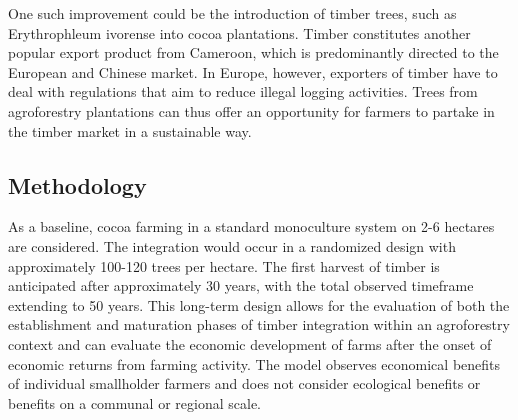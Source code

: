 \documentclass[
]{article}
\begin{document}
One such improvement could be the introduction of timber trees, such as
Erythrophleum ivorense into cocoa plantations. Timber constitutes
another popular export product from Cameroon, which is predominantly
directed to the European and Chinese market. In Europe, however,
exporters of timber have to deal with regulations that aim to reduce
illegal logging activities. Trees from agroforestry plantations can thus
offer an opportunity for farmers to partake in the timber market in a
sustainable way.

\hypertarget{methodology}{%
\subsection{Methodology}\label{methodology}}

As a baseline, cocoa farming in a standard monoculture system on 2-6
hectares are considered. The integration would occur in a randomized
design with approximately 100-120 trees per hectare. The first harvest
of timber is anticipated after approximately 30 years, with the total
observed timeframe extending to 50 years. This long-term design allows
for the evaluation of both the establishment and maturation phases of
timber integration within an agroforestry context and can evaluate the
economic development of farms after the onset of economic returns from
farming activity. The model observes economical benefits of individual
smallholder farmers and does not consider ecological benefits or
benefits on a communal or regional scale.
\end{document}
